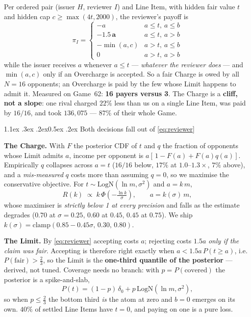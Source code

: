 \documentclass[9pt,a4paper,twocolumn]{article}
\makeatletter
\renewcommand\section{\@startsection{section}{1}{\z@}%
  {1.1ex \@plus .3ex \@minus .2ex}{0.5ex \@plus .2ex}%
  {\normalfont\normalsize\bfseries}}
\newcommand{\charge}{a}
\newcommand{\limitv}{b}
\newcommand{\fair}{t}
\makeatother
\begin{document}
Per ordered pair (issuer $H$, reviewer $I$) and Line Item, with hidden fair value $\fair$ and
hidden cap $c\ge\max(4\fair,2000)$, the reviewer's payoff is
\begin{equation}
\pi_I=
\begin{cases}
-\charge & \charge\le\fair,\ \charge\le\limitv\\
\mathbf{-1.5\,\charge} & \charge\le\fair,\ \charge>\limitv\\
-\min(\charge,c) & \charge>\fair,\ \charge\le\limitv\\
0 & \charge>\fair,\ \charge>\limitv
\end{cases}
\label{eq:reviewer}
\end{equation}
while the issuer receives $\charge$ whenever $\charge\le\fair$ --- \emph{whatever the reviewer
does} --- and $\min(\charge,c)$ only if an Overcharge is accepted. So a fair Charge is owed by all
$N=16$ opponents; an Overcharge is paid by the few whose Limit happens to admit it. Measured on
Game~62: \textbf{16 payers versus 3}. The Charge is a \textbf{cliff, not a slope}: one rival
charged $22\%$ less than us on a single Line Item, was paid by $16/16$, and took $136{,}075$ ---
$87\%$ of their whole Game.

\section{Both decisions fall out of \eqref{eq:reviewer}}

\textbf{The Charge.} With $F$ the posterior CDF of $\fair$ and $q$ the fraction of opponents whose
Limit admits $\charge$, income per opponent is $\charge[\,1-F(\charge)+F(\charge)q(\charge)]$.
Empirically $q$ collapses across $\charge=\fair$ ($16/16$ below, $17\%$ at $1.0$--$1.3\times$,
$7\%$ above), and a \emph{mis-measured} $q$ costs more than assuming $q=0$, so we maximise the
conservative objective. For $\fair\sim\mathrm{LogN}(\ln m,\sigma^2)$ and $\charge=k\,m$,
\begin{equation}
R(k)\;\propto\;k\,\Phi\!\left(-\tfrac{\ln k}{\sigma}\right),
\qquad \charge=k(\sigma)\,m,
\end{equation}
whose maximiser is \emph{strictly below 1 at every precision} and falls as the estimate degrades
($0.70$ at $\sigma{=}0.25$, $0.60$ at $0.45$, $0.45$ at $0.75$). We ship
$k(\sigma)=\mathrm{clamp}(0.85-0.45\sigma,\,0.30,\,0.80)$.

\textbf{The Limit.} By \eqref{eq:reviewer} accepting costs $\charge$; rejecting costs
$1.5\charge$ \emph{only if the claim was fair}. Accepting is therefore right exactly when
$\charge<1.5\charge\,P(\fair\ge\charge)$, i.e.\ $P(\text{fair})>\frac23$, so the Limit is the
\textbf{one-third quantile of the posterior} --- derived, not tuned. Coverage needs no branch:
with $p=P(\text{covered})$ the posterior is a spike-and-slab,
\begin{equation}
P(\fair)=(1-p)\,\delta_0+p\,\mathrm{LogN}(\ln m,\sigma^2),
\end{equation}
so when $p\le\frac23$ the bottom third \emph{is} the atom at zero and $\limitv=0$ emerges on its
own. $40\%$ of settled Line Items have $\fair=0$, and paying on one is a pure loss.
\end{document}
